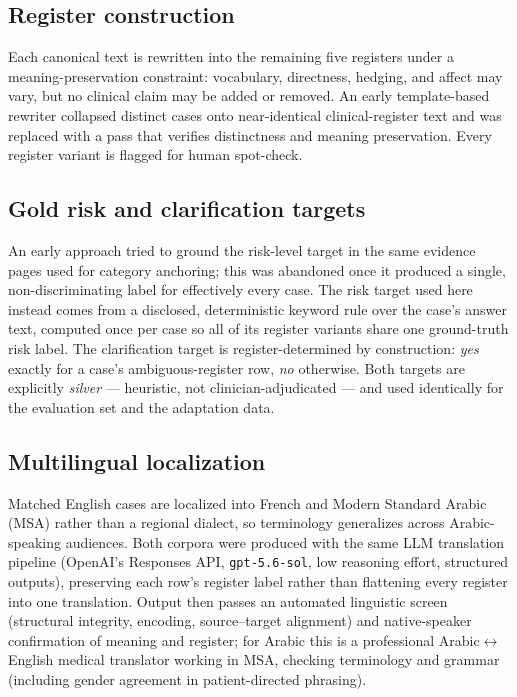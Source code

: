 \subsection{Register construction}

Each canonical text is rewritten into the remaining five registers under a meaning-preservation constraint: vocabulary, directness, hedging, and affect may vary, but no clinical claim may be added or removed. An early template-based rewriter collapsed distinct cases onto near-identical clinical-register text and was replaced with a pass that verifies distinctness and meaning preservation. Every register variant is flagged for human spot-check.

\subsection{Gold risk and clarification targets}
\label{sec:gold-labels}

An early approach tried to ground the risk-level target in the same evidence pages used for category anchoring; this was abandoned once it produced a single, non-discriminating label for effectively every case. The risk target used here instead comes from a disclosed, deterministic keyword rule over the case's answer text, computed once per case so all of its register variants share one ground-truth risk label. The clarification target is register-determined by construction: \emph{yes} exactly for a case's ambiguous-register row, \emph{no} otherwise. Both targets are explicitly \emph{silver} --- heuristic, not clinician-adjudicated --- and used identically for the evaluation set and the adaptation data.

\subsection{Multilingual localization}

Matched English cases are localized into French and Modern Standard Arabic (MSA) rather than a regional dialect, so terminology generalizes across Arabic-speaking audiences. Both corpora were produced with the same LLM translation pipeline (OpenAI's Responses API, \texttt{gpt-5.6-sol}, low reasoning effort, structured outputs), preserving each row's register label rather than flattening every register into one translation. Output then passes an automated linguistic screen (structural integrity, encoding, source--target alignment) and native-speaker confirmation of meaning and register; for Arabic this is a professional Arabic$\leftrightarrow$English medical translator working in MSA, checking terminology and grammar (including gender agreement in patient-directed phrasing).

